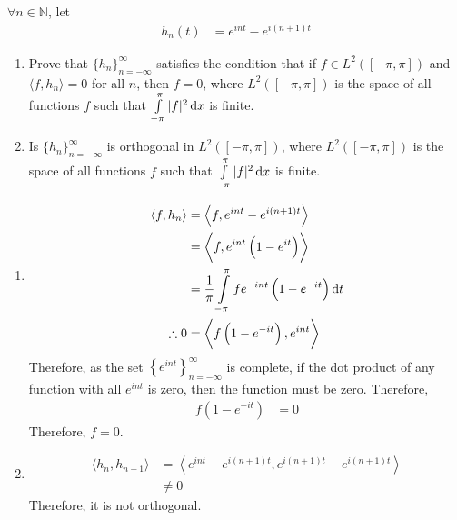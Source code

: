 \documentclass[fleqn, a4paper, 12pt, twoside]{article}
\theoremstyle{definition}
\theoremstyle{theorem}
\begin{document}
\begin{question}
	$\forall n \in \mathbb{N}$, let
	\begin{align*}
		h_n(t) & = e^{i n t} - e^{i (n + 1) t}
	\end{align*}
	\begin{enumerate}
		\item
			Prove that $\{h_n\}_{n = -\infty}^{\infty}$ satisfies the condition that if $f \in L^2\left( [-\pi,\pi] \right)$ and $\langle f,h_n \rangle = 0$ for all $n$, then $f = 0$, where $L^2\left( [-\pi,\pi] \right)$ is the space of all functions $f$ such that $\int\limits_{-\pi}^{\pi} |f|^2 \dif x$ is finite.
		\item
			Is $\{h_n\}_{n = -\infty}^{\infty}$ is orthogonal in $L^2\left( [-\pi,\pi] \right)$, where $L^2\left( [-\pi,\pi] \right)$ is the space of all functions $f$ such that $\int\limits_{-\pi}^{\pi} |f|^2 \dif x$ is finite.
	\end{enumerate}
\end{question}

\begin{solution}
	\begin{enumerate}
		\item
			\begin{align*}
				\langle f,h_n \rangle & = \left\langle f,e^{i n t} - e^{i (n + 1) t} \right\rangle                               \\
                                                      & = \left\langle f,e^{i n t} \left( 1 - e^{i t} \right) \right\rangle                      \\
                                                      & = \frac{1}{\pi} \int\limits_{-\pi}^{\pi} f e^{-i n t} \left( 1 - e^{-i t} \right) \dif t \\
				\therefore 0          & = \left\langle f \left( 1 - e^{-i t} \right),e^{i n t} \right\rangle                     \\
			\end{align*}
			Therefore, as the set $\left\{ e^{i n t} \right\}_{n = -\infty}^{\infty}$ is complete, if the dot product of any function with all $e^{i n t}$ is zero, then the function must be zero.
			Therefore,
			\begin{align*}
				f \left( 1 - e^{-i t} \right) & = 0
			\end{align*}
			Therefore, $f = 0$.
		\item
			\begin{align*}
				\langle h_n,h_{n + 1} \rangle & = \left\langle e^{i n t} - e^{i (n + 1) t},e^{i (n + 1) t} - e^{i (n + 1) t} \right\rangle \\
                                                              & \neq 0
			\end{align*}
			Therefore, it is not orthogonal.
	\end{enumerate}
\end{solution}
\end{document}
